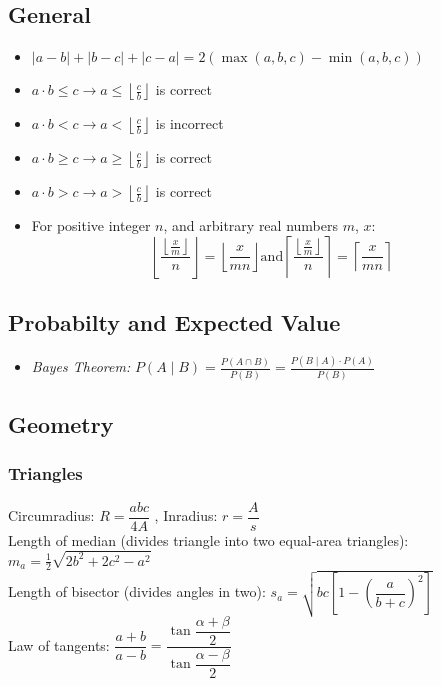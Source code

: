 {\selectfont
{}
\subsection{General}
\begin{itemize}[leftmargin=*, noitemsep]
  \item $|a - b| + |b - c| + |c - a| = 2 (\max(a, b, c) - \min(a, b, c))$

  \item $a \cdot b \leq c \to a \leq \left\lfloor \frac{c}{b} \right\rfloor$ is correct

  \item $a \cdot b < c \to a < \left\lfloor \frac{c}{b} \right\rfloor$ is incorrect

  \item $a \cdot b \geq c \to a \geq \left\lfloor \frac{c}{b} \right\rfloor$ is correct

  \item $a \cdot b > c \to a > \left\lfloor \frac{c}{b} \right\rfloor$ is correct

  \item For positive integer $n$, and arbitrary real numbers $m$, $x$:
  $$
  \left\lfloor \frac{\left\lfloor \frac{x}{m} \right\rfloor}{n} \right\rfloor = \left\lfloor \frac{x}{mn} \right\rfloor
  \text{and}
  \left\lceil \frac{\left\lfloor \frac{x}{m} \right\rfloor}{n} \right\rceil = \left\lceil \frac{x}{mn} \right\rceil
  $$
\end{itemize}

\subsection{Probabilty and Expected Value}
\begin{itemize} [leftmargin=*, noitemsep]
  \item \emph{Bayes Theorem:} $P(A \mid B) = \frac{P(A \cap B)}{P(B)} = \frac{P(B \mid A) \cdot P(A)}{P(B)}$
\end{itemize}

\subsection{Geometry}
\subsubsection{Triangles}
Circumradius: $R=\dfrac{abc}{4A}$ , Inradius: $r=\dfrac{A}{s}$\\
Length of median (divides triangle into two equal-area triangles): $m_a=\tfrac{1}{2}\sqrt{2b^2+2c^2-a^2}$\\
Length of bisector (divides angles in two): $s_a=\sqrt{bc\left[1-\left(\dfrac{a}{b+c}\right)^2\right]}$\\
Law of tangents: $\dfrac{a+b}{a-b}=\dfrac{\tan\dfrac{\alpha+\beta}{2}}{\tan\dfrac{\alpha-\beta}{2}}$\\
}
